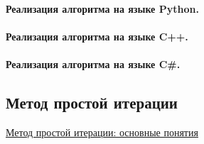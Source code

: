 \documentclass[12pt]{article}
\begin{document}
\paragraph{Реализация алгоритма на языке Python.}

\paragraph{Реализация алгоритма на языке C++.}

\paragraph{Реализация алгоритма на языке C\#.}

\subsection{Метод простой итерации}

\href{https://zaochnik.com/spravochnik/matematika/issledovanie-slau/iteratsionnye-metody-reshenija-slau/}{Метод простой итерации: основные понятия}
\end{document}
